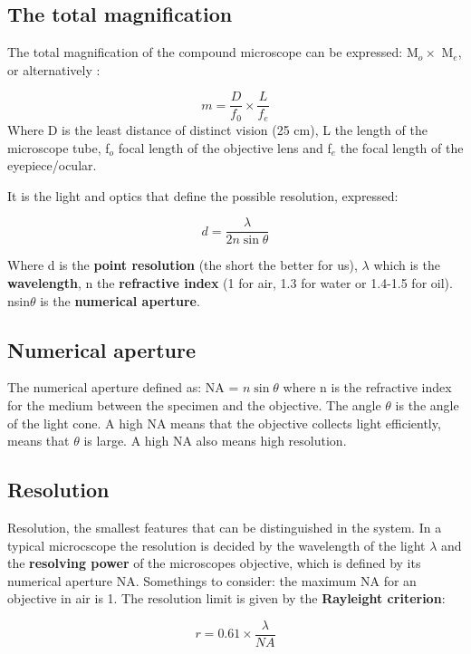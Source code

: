	\subsection*{The total magnification}
	The total magnification of the compound microscope can be expressed: M$_o \times$ M$_e$, or alternatively :

		\begin{equation}
		 	m = \frac{D} {f_0} \times \frac{L} {f_e} 
		 \end{equation}
	Where D is the least distance of distinct vision (25 cm), L the  length of the microscope tube, f$_o$ focal length of the objective lens and f$_e$ the focal length of the eyepiece/ocular. 

	It is the light and optics that define the possible resolution, expressed:

		\begin{equation}
			d = \frac{\lambda} {2n\sin\theta} 
		\end{equation}

	Where d is the \textbf{point resolution} (the short the better for us), $\lambda$ which is the \textbf{wavelength}, n the \textbf{refractive index} (1 for air, 1.3 for water or 1.4-1.5 for oil). nsin$\theta$ is the \textbf{numerical aperture}. 

	\subsection*{Numerical aperture}
	The numerical aperture defined as: NA = $n\sin\theta$ where n is the refractive index for the medium between the specimen and the objective. The angle $\theta$ is the angle of the light cone. A high NA means that the objective collects light efficiently, means that $\theta$ is large. A high NA also means high resolution. 

	\subsection*{Resolution}
	Resolution, the smallest features that can  be distinguished in the system. In a typical microcscope the resolution is decided by the wavelength of the light $\lambda$ and the \textbf{resolving power} of the microscopes objective, which is defined by its numerical aperture NA. 
	Somethings to consider: the maximum NA for an objective in air is 1. The resolution limit is given by the \textbf{Rayleight criterion}:

		\begin{equation}
		r = 0.61 \times \frac{\lambda} {NA} 
		\end{equation}

